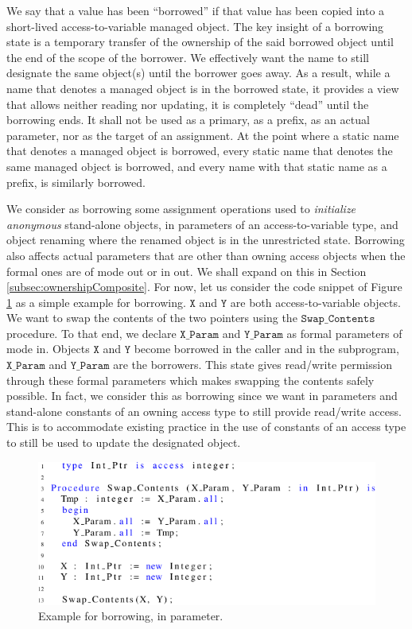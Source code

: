 \documentclass{llncs}
\newcommand\var[1]{\ensuremath{\mathtt{#1}}}
\newcommand{\keyword}[1]{\textsf{#1}}
\begin{document}
We say that a value has been ``borrowed'' if that value has been copied into a short-lived access-to-variable managed object.
The key insight of a borrowing state is a temporary transfer of the ownership of the said borrowed object until the end of the scope of the borrower.
We effectively want the name to still designate the same object(s) until the borrower goes away. As a result, while a name that denotes a managed object
is in the borrowed state, it provides a view that allows neither reading nor updating, it is completely ``dead'' until the borrowing ends. It shall not
be used as a primary, as a prefix, as an actual parameter, nor as the target of an assignment. At the point where a static name that denotes a managed
object is borrowed, every static name that denotes the same managed object is borrowed, and every name with that static name as a prefix, is similarly borrowed.

\smallskip
We consider as borrowing some assignment operations used to \textit{initialize anonymous} stand-alone objects, \keyword{in} parameters of an access-to-variable
type, and object renaming where the renamed object is in the unrestricted state. Borrowing also affects actual parameters that are other than owning access objects
when the formal ones are of mode \keyword{out} or \keyword{in out}. We shall expand on this in Section \ref{subsec:ownershipComposite}. For now, let us consider the
code snippet of Figure \ref{fig:borrow_ex1} as a simple example for borrowing. \var{X} and \var{Y} are both access-to-variable objects. We want to swap the contents of the two
pointers using the \var{Swap\_Contents} procedure. To that end, we declare \var{X\_Param} and \var{Y\_Param} as formal parameters of mode \keyword{in}. Objects \var{X} and \var{Y} become borrowed
in the caller and in the subprogram, \var{X\_Param} and \var{Y\_Param} are the borrowers. This state gives read/write permission through these formal parameters which makes swapping
the contents safely possible. In fact, we consider this as borrowing since we want \keyword{in} parameters and stand-alone constants of an owning access type to still
provide read/write access. This is to accommodate existing practice in the use of constants of an access type to still be used to update the designated object.

\begin{figure}[htb!]
\centering
   \includegraphics[]{borrow_ex1}
   \caption{Example for borrowing, \keyword{in} parameter.}
   \label{fig:borrow_ex1}
\end{figure}
\end{document}
